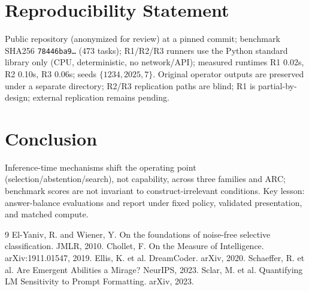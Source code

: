 \documentclass{article}
\begin{document}
\section{Reproducibility Statement}
Public repository (anonymized for review) at a pinned commit; benchmark SHA256 \texttt{78446ba9\ldots} (473 tasks); R1/R2/R3 runners use the Python standard library only (CPU, deterministic, no network/API); measured runtimes R1 0.02s, R2 0.10s, R3 0.06s; seeds $\{1234,2025,7\}$. Original operator outputs are preserved under a separate directory; R2/R3 replication paths are blind; R1 is partial-by-design; external replication remains pending.

\section{Conclusion}
Inference-time mechanisms shift the operating point (selection/abstention/search), not capability, across three families and ARC; benchmark scores are not invariant to construct-irrelevant conditions. Key lesson: answer-balance evaluations and report under fixed policy, validated presentation, and matched compute.


\begin{thebibliography}{9}
 El-Yaniv, R. and Wiener, Y. On the foundations of noise-free selective classification. JMLR, 2010.
 Chollet, F. On the Measure of Intelligence. arXiv:1911.01547, 2019.
 Ellis, K. et al. DreamCoder. arXiv, 2020.
 Schaeffer, R. et al. Are Emergent Abilities a Mirage? NeurIPS, 2023.
 Sclar, M. et al. Quantifying LM Sensitivity to Prompt Formatting. arXiv, 2023.
\end{thebibliography}
\end{document}
